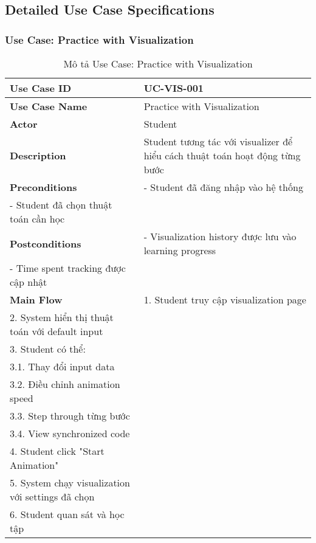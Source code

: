 \subsection{Detailed Use Case Specifications}
\label{subsec:detailed-usecase-specs}

\subsubsection{Use Case: Practice with Visualization}

\begin{table}[H]
\centering
\caption{Mô tả Use Case: Practice with Visualization}
\label{tab:uc-practice-visualization}
\begin{tabularx}{\textwidth}{|l|X|}
\hline
\textbf{Use Case ID} & UC-VIS-001 \\ \hline
\textbf{Use Case Name} & Practice with Visualization \\ \hline
\textbf{Actor} & Student \\ \hline
\textbf{Description} & Student tương tác với visualizer để hiểu cách thuật toán hoạt động từng bước \\ \hline
\textbf{Preconditions} & 
- Student đã đăng nhập vào hệ thống \\
- Student đã chọn thuật toán cần học \\ \hline
\textbf{Postconditions} & 
- Visualization history được lưu vào learning progress \\
- Time spent tracking được cập nhật \\ \hline
\textbf{Main Flow} & 
1. Student truy cập visualization page \\
2. System hiển thị thuật toán với default input \\
3. Student có thể: \\
\hspace{0.5cm} 3.1. Thay đổi input data \\
\hspace{0.5cm} 3.2. Điều chỉnh animation speed \\
\hspace{0.5cm} 3.3. Step through từng bước \\
\hspace{0.5cm} 3.4. View synchronized code \\
4. Student click "Start Animation" \\
5. System chạy visualization với settings đã chọn \\
6. Student quan sát và học tập \\

\end{tabularx}
\end{table}
